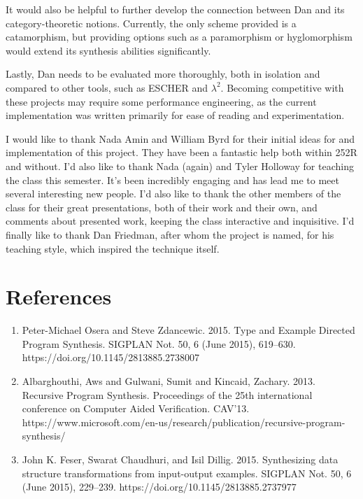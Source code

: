 \documentclass[acmsmall,screen]{acmart}
\begin{document}
It would also be helpful to further develop the connection between Dan and its category-theoretic notions. Currently, the only scheme provided is a catamorphism, but providing options such as a paramorphism or hyglomorphism would extend its synthesis abilities significantly.

Lastly, Dan needs to be evaluated more thoroughly, both in isolation and compared to other tools, such as ESCHER and $\lambda^2$. Becoming competitive with these projects may require some performance engineering, as the current implementation was written primarily for ease of reading and experimentation.

\begin{acks}
    I would like to thank Nada Amin and William Byrd for their initial ideas for and implementation of this project. They have been a fantastic help both within 252R and without. I'd also like to thank Nada (again) and Tyler Holloway for teaching the class this semester. It's been incredibly engaging and has lead me to meet several interesting new people. I'd also like to thank the other members of the class for their great presentations, both of their work and their own, and comments about presented work, keeping the class interactive and inquisitive. I'd finally like to thank Dan Friedman, after whom the project is named, for his teaching style, which inspired the technique itself.
\end{acks}

\section*{References}

\begin{enumerate}
  \item Peter-Michael Osera and Steve Zdancewic. 2015. Type and Example Directed Program Synthesis. SIGPLAN Not. 50, 6 (June 2015), 619–630. https://doi.org/10.1145/2813885.2738007
  \item Albarghouthi, Aws and Gulwani, Sumit and Kincaid, Zachary. 2013. Recursive Program Synthesis. Proceedings of the 25th international conference on Computer Aided Verification. CAV'13. https://www.microsoft.com/en-us/research/publication/recursive-program-synthesis/
  \item John K. Feser, Swarat Chaudhuri, and Isil Dillig. 2015. Synthesizing data structure transformations from input-output examples. SIGPLAN Not. 50, 6 (June 2015), 229–239. https://doi.org/10.1145/2813885.2737977
\end{enumerate}
\end{document}
